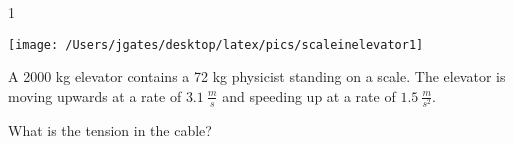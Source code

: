 
\AddToShipoutPicture*{\BackgroundPic}

\addtocounter {ProbNum} {1}

\begin{floatingfigure}[r]{.2\textwidth}
\texttt{[image: /Users/jgates/desktop/latex/pics/scaleinelevator1]}
\end{floatingfigure}
 
{\bf \Large{}} A 2000 kg elevator contains a 72 kg physicist standing on a scale. The elevator is moving upwards at a rate of ${3.1~\tfrac{m}{s}}$ and speeding up at a rate of ${1.5~\tfrac{m}{s^2}}$.

\bigskip
What is the tension in the cable?




\vfill
\newpage
